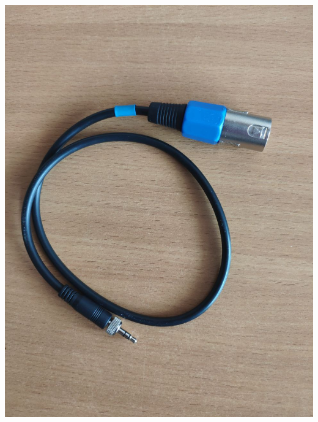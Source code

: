 \begin{enumerate}
\begin{enumerate}
                \begin{minipage}[c]{0.29\textwidth}
                  \includegraphics[width=\textwidth]{Images/PortableCamera/micro/step10.3-1-xlr-adapter.jpg}
                \end{minipage}
                \hfill
                \begin{minipage}[c]{0.29\textwidth}

\end{minipage}
\end{enumerate}
\end{enumerate}

